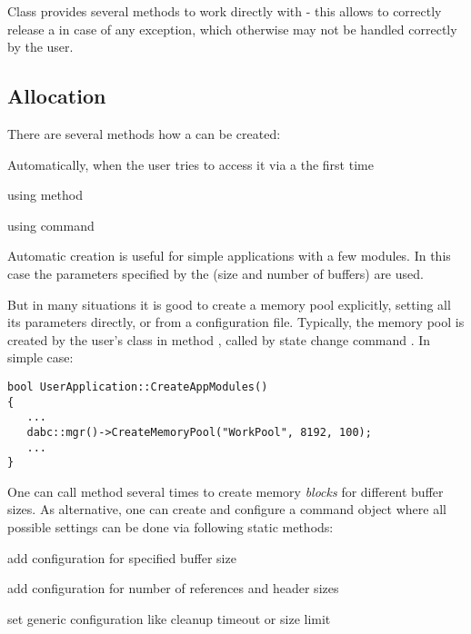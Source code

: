 Class  provides several methods to work directly 
with  - this allows to correctly release a 
in case of any exception, which otherwise may not be handled correctly by the user.  


\subsection{Allocation}
\label{prog_services_memory_allocation}
There are several methods how a  can be created:
\bbul
\item Automatically, when the user  tries to access it via a 
 the first time

\item using  method

\item using  command
\ebul

Automatic creation is useful for simple applications with a few modules.
In this case the parameters specified by the 
 (size and number of buffers) are used. 

But in many situations it is good to create a memory pool explicitly,
setting all its parameters directly, or from a  configuration file.
Typically, the memory pool is created by the user's  class in 
method , called by state change command .
In simple case:

\begin{small}
\begin{verbatim}     
bool UserApplication::CreateAppModules()
{
   ...
   dabc::mgr()->CreateMemoryPool("WorkPool", 8192, 100);
   ...
}
\end{verbatim}     
\end{small}

One can call  method several times to create 
memory {\em blocks} for different buffer sizes. As alternative, one can create and 
configure a command object  
where all possible settings can be 
done via following static methods:
\bbul
\item[\func{AddMem()}] add configuration for specified buffer size 
\item[\func{AddRef()}] add configuration for number of references and header sizes 
\item[\func{AddCfg()}] set generic configuration like cleanup timeout or size limit 
\ebul

